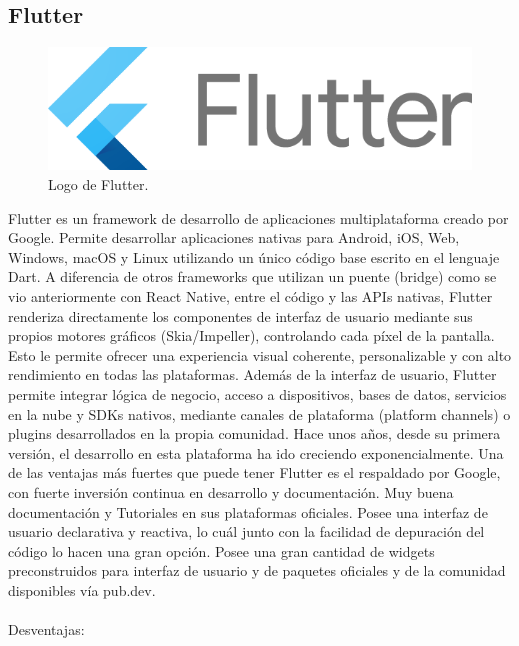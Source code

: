 \subsection{Flutter}
\begin{figure}[h]
    \centering
    \includegraphics[scale=0.15]{Graphics/flutter_logo.png}
    \caption{Logo de Flutter.}
    \label{fig:figura12}
\end{figure}
Flutter es un framework de desarrollo de aplicaciones multiplataforma creado por Google. Permite desarrollar aplicaciones nativas para Android, iOS, Web, Windows, macOS y Linux utilizando un único código base escrito en el lenguaje Dart.
A diferencia de otros frameworks que utilizan un puente (bridge) como se vio anteriormente con React Native, entre el código y las APIs nativas, Flutter renderiza directamente los componentes de interfaz de usuario mediante sus propios motores gráficos (Skia/Impeller), controlando cada píxel de la pantalla. Esto le permite ofrecer una experiencia visual coherente, personalizable y con alto rendimiento en todas las plataformas.
Además de la interfaz de usuario, Flutter permite integrar lógica de negocio, acceso a dispositivos, bases de datos, servicios en la nube y SDKs nativos, mediante canales de plataforma (platform channels) o plugins desarrollados en la propia comunidad.
Hace unos años, desde su primera versión, el desarrollo en esta plataforma ha ido creciendo exponencialmente. Una de las ventajas más fuertes que puede tener Flutter es el respaldado por Google, con fuerte inversión continua en desarrollo y documentación.
Muy buena documentación y Tutoriales en sus plataformas oficiales.
Posee una interfaz de usuario declarativa y reactiva, lo cuál junto con la facilidad de depuración del código lo hacen una gran opción. Posee una gran cantidad de widgets preconstruidos para interfaz de usuario y de paquetes oficiales y de la comunidad disponibles vía pub.dev.\\\\
Desventajas:
